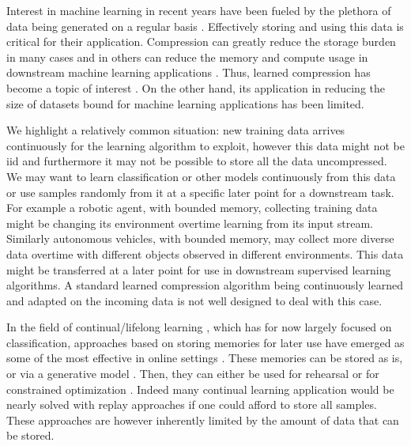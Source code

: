 \documentclass[colorinlistoftodos]{article} %
\begin{document}
Interest in machine learning in recent years have been fueled by the plethora of data being generated on a regular basis \cite{goodfellow2016deep}. Effectively storing and using this data is critical for their application. Compression can greatly reduce the storage burden in many cases and in others can reduce the memory and compute usage in downstream machine learning applications \citep{JPEG,Oyallon_2018_ECCV}. Thus, learned compression has become a topic of interest \citep{theis2017lossy,balle2016end,johnston2018improved}. On the other hand, its application in reducing the size of datasets bound for machine learning applications has been limited.

We highlight a relatively common situation: new training data arrives continuously for the learning algorithm to exploit, however this data might not be iid and furthermore it may not be possible to store all the data uncompressed. We may want to learn classification or other models continuously from this data or use samples randomly from it at a specific later point for a downstream task. For example a robotic agent, with bounded memory, collecting training data might be changing its environment overtime learning from its input stream. Similarly autonomous vehicles, with bounded memory, may collect more diverse data overtime with different objects observed in different environments. This data might be transferred at a later point for use in downstream supervised learning algorithms. A standard learned compression algorithm \cite{torfason2018towards} being continuously learned and adapted on the incoming data is not well designed to deal with this case.  


In the field of continual/lifelong learning \citep{thrun1995lifelong}, which has for now largely focused on classification, approaches based on storing memories for later use have emerged as some of the most effective in online settings \citep{lopez2017gradient,aljundi2018Online,chaudhry2018efficient,chaudhry2019continual,aljundi2019online}. These memories can be stored as is, or via a generative model \citep{shin2017continual}. Then, they can either be used for rehearsal \citep{chaudhry2019continual,aljundi2019online} or for constrained optimization \cite{lopez2017gradient,chaudhry2018efficient,aljundi2018Online}.
Indeed many continual learning application would be nearly solved with replay approaches if one could afford to store all samples. These approaches are however inherently limited by the amount of data that can be stored. 
\end{document}

